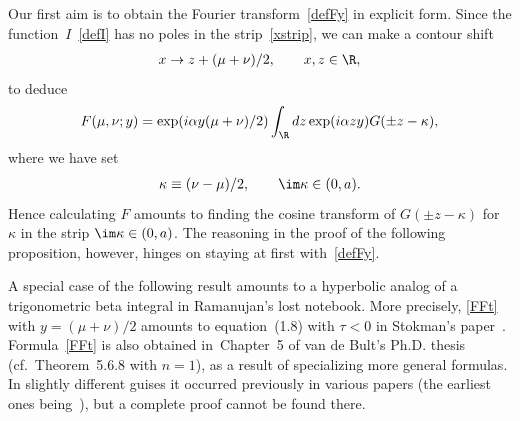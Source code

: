 \documentclass[pdftex]{sigma}
\numberwithin{equation}{section}
\begin{document}
Our f\/irst aim is to obtain the Fourier transform~\eqref{defFy} in explicit form. Since the func\-tion~$I$~\eqref{defI} has no poles in the strip~\eqref{xstrip}, we can make a contour shift
\begin{gather}
x \to z +(\mu+\nu)/2,\qquad x,z\in\R,
\end{gather}
to deduce
\begin{gather}\label{Fkap}
F(\mu,\nu;y)=\exp(i\alpha y(\mu+\nu)/2)\int_{\R}dz \exp(i\alpha zy)G(\pm z-\kappa),
\end{gather}
where we have set
\begin{gather}\label{kappa}
\kappa \equiv (\nu-\mu)/2,\qquad \im \kappa \in(0,a).
\end{gather}
Hence calculating $F$ amounts to f\/inding the cosine transform of $G(\pm z-\kappa)$ for $\kappa$ in the strip $\im \kappa\in(0,a)$. The reasoning in the proof of the following proposition, however, hinges on staying at f\/irst with~\eqref{defFy}.

A special case of the following result amounts to a hyperbolic analog of a trigonometric beta integral in Ramanujan's lost notebook. More precisely, \eqref{FFt} with $y=(\mu+\nu)/2$ amounts to equation~(1.8) with $\tau<0$ in Stokman's paper~\cite{stok}. Formula~\eqref{FFt} is also obtained in~Chapter~5 of van de Bult's Ph.D. thesis~\cite{bult2} (cf.~Theorem~5.6.8 with $n=1$), as a result of specializing more general formulas. In slightly dif\/ferent guises it occurred previously in various papers (the earliest ones being~\cite{faka,kash,pote}), but a complete proof cannot be found there.
\end{document}
